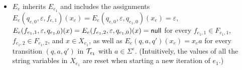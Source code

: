 \begin{itemize}
			\item $E_e$ inherits $E_{e_1}$ and includes the assignments $E_e(q_{e,0},\varepsilon,f_{e,1})(x_e) = E_e(q_{e,0},\varepsilon,q_{e_1,0})(x_e) = \varepsilon$, $E_e(f_{e_1,1},\varepsilon, q_{e_1,0})(x) = E_e(f_{e_1,2},\varepsilon, q_{e_1,0})(x)= \mathsf{null}$ for every $f_{e_1,1} \in F_{e_1,1}$, $f_{e_1,2} \in F_{e_1,2}$, and $x \in X_{e_1}$, as well as $E_e(q, a, q')(x_e) = x_e a$ for every transition $(q, a, q')$ in $\mathcal{T}_{e_1}$ with $a \in \Sigma^\varepsilon$. (Intuitively, the values of all the string variables in $X_{e_1}$ are reset when starting a new iteration of $e_1$.)
		\end{itemize}

